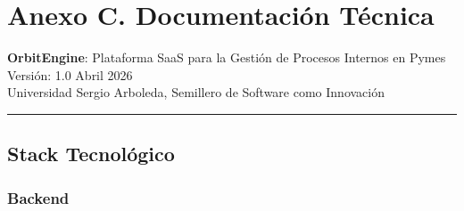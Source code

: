 \chapter{Anexo C. Documentación Técnica}\label{anexo-c.-documentaciuxf3n-tuxe9cnica}

\textbf{OrbitEngine}: Plataforma SaaS para la Gestión de Procesos Internos en Pymes\\
Versión: 1.0 \textbar{} Abril 2026\\
Universidad Sergio Arboleda, Semillero de Software como Innovación

\begin{center}\rule{0.5\linewidth}{0.5pt}\end{center}

\section{Stack Tecnológico}\label{stack-tecnoluxf3gico}

\subsection{Backend}\label{backend}

